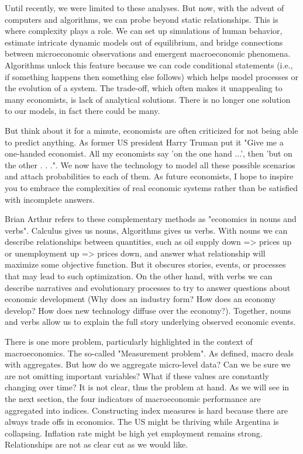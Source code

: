 \documentclass[10pt]{article}
\begin{document}
Until recently, we were limited to these analyses. But now, with the advent of computers and algorithms, we can probe beyond static relationships. This is where complexity plays a role. We can set up simulations of human behavior, estimate intricate dynamic models out of equilibrium, and bridge connections between microeconomic observations and emergent macroeconomic phenomena. Algorithms unlock this feature because we can code conditional statements (i.e., if something happens then something else follows) which helps model processes or the evolution of a system. The trade-off, which often makes it unappealing to many economists, is lack of analytical solutions. There is no longer one solution to our models, in fact there could be many.

But think about it for a minute, economists are often criticized for not being able to predict anything. As former US president Harry Truman put it "Give me a one-handed economist. All my economists say 'on the one hand ...', then 'but on the other . . .". We now have the technology to model all these possible scenarios and attach probabilities to each of them. As future economists, I hope to inspire you to embrace the complexities of real economic systems rather than be satisfied with incomplete answers.

Brian Arthur refers to these complementary methods as "economics in nouns and verbs". Calculus gives us nouns, Algorithms gives us verbs. With nouns we can describe relationships between quantities, such as oil supply down => prices up or unemployment up => prices down, and answer what relationship will maximize some objective function. But it obscures stories, events, or processes that may lead to such optimization. On the other hand, with verbs we can describe narratives and evolutionary processes to try to answer questions about economic development (Why does an industry form? How does an economy develop? How does new technology diffuse over the economy?). Together, nouns and verbs allow us to explain the full story underlying observed economic events.

There is one more problem, particularly highlighted in the context of macroeconomics. The so-called "Measurement problem". As defined, macro deals with aggregates. But how do we aggregate micro-level data? Can we be sure we are not omitting important variables? What if these values are constantly changing over time? It is not clear, thus the problem at hand. As we will see in the next section, the four indicators of macroeconomic performance are aggregated into indices. Constructing index measures is hard because there are always trade offs in economics. The US might be thriving while Argentina is collapsing. Inflation rate might be high yet employment remains strong. Relationships are not as clear cut as we would like.
\end{document}
